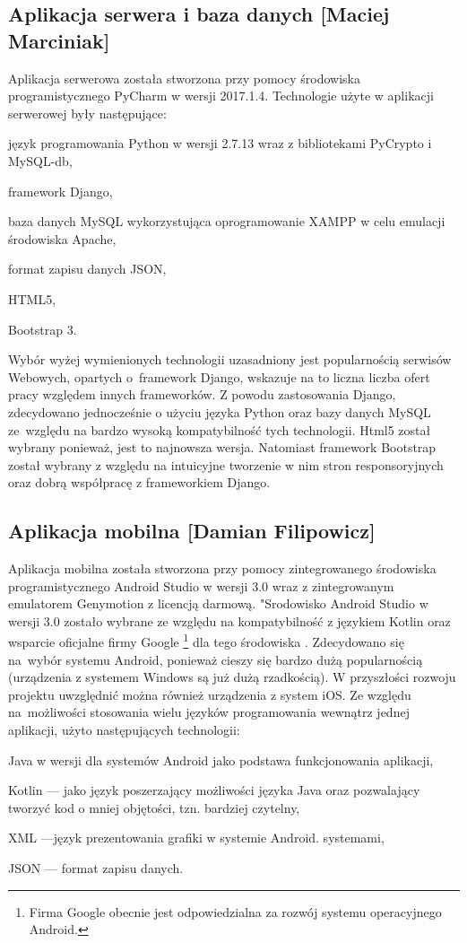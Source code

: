 \documentclass[twoside,10pt]{article}
\begin{document}
\subsection{Aplikacja serwera i baza danych [Maciej Marciniak]}
Aplikacja serwerowa została stworzona przy pomocy środowiska programistycznego PyCharm w wersji 2017.1.4. Technologie użyte w aplikacji serwerowej były następujące:
\begin{itemize*}
\item język programowania Python w wersji 2.7.13 wraz z bibliotekami PyCrypto i MySQL-db,
\item framework Django,
\item baza danych MySQL wykorzystująca oprogramowanie XAMPP w celu emulacji środowiska Apache,
\item format zapisu danych JSON,
\item HTML5,
\item Bootstrap 3.
\end{itemize*}

Wybór wyżej wymienionych technologii uzasadniony jest popularnością serwisów Webowych, opartych o~framework Django, wskazuje na to liczna liczba ofert pracy względem innych frameworków. Z powodu zastosowania Django, zdecydowano jednocześnie o użyciu języka Python oraz bazy danych MySQL ze~względu na bardzo wysoką kompatybilność tych technologii. Html5 został wybrany ponieważ, jest to najnowsza wersja. Natomiast framework Bootstrap został wybrany z względu na intuicyjne tworzenie w nim stron responsoryjnych oraz dobrą współpracę z frameworkiem Django.

\newpage
\subsection{Aplikacja mobilna [Damian Filipowicz]}
Aplikacja mobilna została stworzona przy pomocy zintegrowanego środowiska programistycznego Android Studio w wersji 3.0 wraz z zintegrowanym emulatorem Genymotion z licencją darmową. "Srodowisko Android Studio w wersji 3.0 zostało wybrane ze względu na kompatybilność z językiem Kotlin oraz wsparcie oficjalne firmy Google \footnote{Firma Google obecnie jest odpowiedzialna za rozwój systemu operacyjnego Android.} dla tego środowiska . Zdecydowano się na~wybór systemu Android, ponieważ cieszy się bardzo dużą popularnością (urządzenia z systemem Windows są już dużą rzadkością). W przyszłości rozwoju projektu uwzględnić można również urządzenia z system iOS. Ze względu na~możliwości stosowania wielu języków programowania wewnątrz jednej aplikacji, użyto następujących technologii:
\begin{itemize*}
\item Java w wersji dla systemów Android jako podstawa funkcjonowania aplikacji,
\item Kotlin --- jako język poszerzający możliwości języka Java oraz pozwalający tworzyć kod o mniej objętości, tzn. bardziej czytelny,
\item XML ---język prezentowania grafiki w systemie Android. systemami,
\item JSON --- format zapisu danych.
\end{itemize*}
\end{document}

